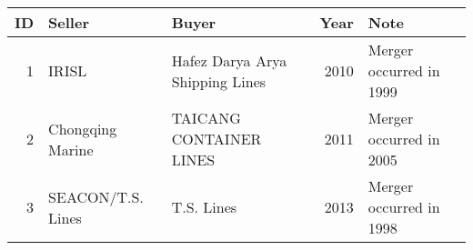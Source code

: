 
\begin{tabular}[t]{rllrl}
\toprule
ID & Seller & Buyer & Year & Note\\
\midrule
1 & IRISL & Hafez Darya Arya Shipping Lines & 2010 & Merger occurred in 1999\\
2 & Chongqing Marine & TAICANG CONTAINER LINES & 2011 & Merger occurred in 2005\\
3 & SEACON/T.S. Lines & T.S. Lines & 2013 & Merger occurred in 1998\\
\bottomrule
\end{tabular}
